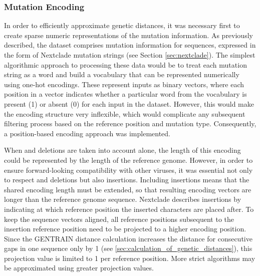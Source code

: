 \subsubsection{Mutation Encoding}
\label{sec:mutation_encoding}
In order to efficiently approximate genetic distances, it was necessary first to create sparse numeric representations of the mutation information. As previously described, the dataset comprises mutation information for sequences, expressed in the form of Nextclade mutation strings (see Section \ref{sec:nextclade}). The simplest algorithmic approach to processing these data would be to treat each mutation string as a word and build a vocabulary that can be represented numerically using one-hot encodings. These represent inputs as binary vectors, where each position in a vector indicates whether a particular word from the vocabulary is present (1) or absent (0) for each input in the dataset. However, this would make the encoding structure very inflexible, which would complicate any subsequent filtering process based on the reference position and mutation type. Consequently, a position-based encoding approach was implemented.

When  and deletions are taken into account alone, the length of this encoding could be represented by the length of the reference genome. However, in order to ensure forward-looking compatibility with other viruses, it was essential not only to respect  and deletions but also insertions. Including insertions means that the shared encoding length must be extended, so that resulting encoding vectors are longer than the reference genome sequence. Nextclade describes insertions by indicating at which reference position the inserted characters are placed after. To keep the sequence vectors aligned, all reference positions subsequent to the insertion reference position need to be projected to a higher encoding position. Since the GENTRAIN distance calculation increases the distance for consecutive gaps in one sequence only by 1 (see \ref{sec:calculation_of_genetic_distances}), this projection value is limited to 1 per reference position. More strict algorithms may be approximated using greater projection values.

